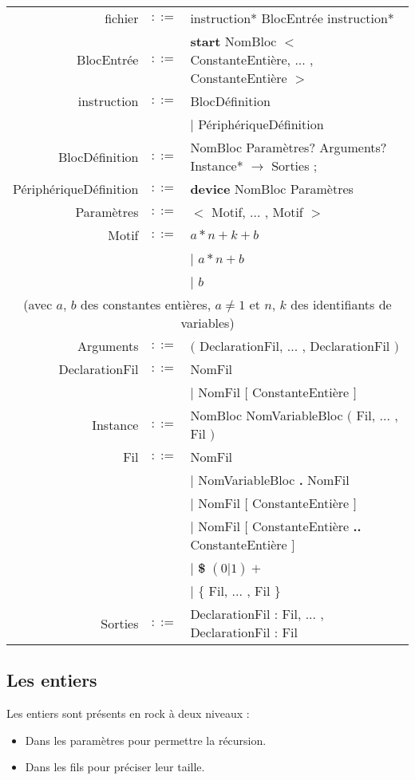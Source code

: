 \documentclass[13pt]{article}
\begin{document}
\begin{tabular}{ r c l }
  fichier &$::=$&\: instruction* BlocEntrée instruction*\\ [1.5ex]
  BlocEntrée &$::=$&\: {\bf start} NomBloc $<$ ConstanteEntière, ... ,
  ConstanteEntière  $>$\\ [1.5ex]
  instruction &$::=$&\: BlocDéfinition\\
  &&| PériphériqueDéfinition \\ [1.5ex]
  BlocDéfinition &$::=$&\: NomBloc Paramètres? Arguments? Instance* $\to$
  Sorties $;$\\ [1.5ex]
  PériphériqueDéfinition &$::=$&\: {\bf device} NomBloc Paramètres\\ [1.5ex]
  Paramètres &$::=$&\: $<$ Motif, ... , Motif $>$\\ [1.5ex]
  Motif &$::=$&\: $a*n+k+b$     \\ 
  &&| $a*n+b$  \\ 
  &&| $b$ \\ 
  \multicolumn{3}{c}{(avec $a$, $b$ des constantes entières, $a
    \neq 1$ et $n$, $k$ des identifiants de variables)} \\ [1.5ex]
  Arguments &$::=$&\: $($ DeclarationFil, ... , DeclarationFil $)$ \\ [1.5ex]
  DeclarationFil  &$::=$&\: NomFil \\
  &&| NomFil $[$ ConstanteEntière $]$ \\ [1.5ex]
 
  Instance &$::=$&\: NomBloc NomVariableBloc $($ Fil, ... , Fil $)$ \\ [1.5ex]
  Fil &$::=$&\: NomFil\\
  &&| NomVariableBloc {\bf .} NomFil\\
  &&| NomFil $[$ ConstanteEntière $]$\\
  &&| NomFil $[$ ConstanteEntière {\bf..} ConstanteEntière $]$\\
  &&| {\bf \$} $(0|1)+$ \\
  &&| $\mathbf{\{}$ Fil, ... , Fil $\mathbf{\}}$\\ [1.5ex]
  Sorties&$::=$&\: DeclarationFil : Fil, ... , DeclarationFil : Fil
\end{tabular}


\subsection{Les entiers} 
Les entiers sont présents en rock à deux niveaux : 
\begin{itemize}
\item Dans les paramètres pour permettre la récursion.
\item Dans les fils pour préciser leur taille.
\end{itemize}
\text{}\\
\end{document}
